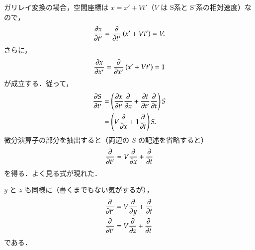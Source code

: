                 ガリレイ変換の場合，空間座標は $x=x'+Vt'$（$V$ は S系と S'系の相対速度）なので，
                    \begin{align*}
                        \frac{\partial x }{\partial t'} = \frac{\partial }{\partial t'} \left( x'+Vt' \right)
                                              = V.
                    \end{align*}
                さらに，
                    \begin{align*}
                        \frac{\partial x}{\partial x'}  = \frac{\partial }{\partial x'} \left( x'+Vt' \right)
                                              = 1
                    \end{align*}
                が成立する．従って，
                    \begin{align*}
                        \frac{\partial S }{\partial t'} &=   \left(
                                                  \frac{\partial x }{\partial t'} \frac{\partial   }{\partial x }
                                                + \frac{\partial t }{\partial t'} \frac{\partial   }{\partial t }
                                                  \right) S \\
                                              &=   \left(
                                                  V \frac{\partial   }{\partial x }
                                                + 1 \frac{\partial   }{\partial t }
                                                  \right) S.
                    \end{align*}
                微分演算子の部分を抽出すると（両辺の $S$ の記述を省略すると）
                    \begin{align}
                        \frac{\partial  }{\partial t'} =  V \frac{\partial   }{\partial x } + \frac{\partial   }{\partial t }
                    \end{align}
                を得る．よく見る式が現れた．

                $y$ と $z$ も同様に（書くまでもない気がするが），
                    \begin{align}
                        \frac{\partial  }{\partial t'} &=  V \frac{\partial   }{\partial y } + \frac{\partial   }{\partial t } \\
                        \frac{\partial  }{\partial t'} &=  V \frac{\partial   }{\partial z } + \frac{\partial   }{\partial t }
                    \end{align}
                である．
